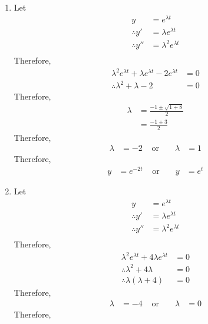 \documentclass[fleqn, a4paper, 11pt, oneside]{amsart}
\theoremstyle{definition}
\theoremstyle{theorem}
\begin{document}
\begin{solution}
	\begin{enumerate}[leftmargin = *]
		\item
			Let
			\begin{align*}
				y              & = e^{\lambda t}           \\
				\therefore y'  & = \lambda e^{\lambda t}   \\
				\therefore y'' & = \lambda^2 e^{\lambda t} \\
			\end{align*}
			Therefore,
			\begin{align*}
				\lambda^2 e^{\lambda t} + \lambda e^{\lambda t} - 2 e^{\lambda t} & = 0 \\
				\therefore \lambda^2 + \lambda - 2                                & = 0
			\end{align*}
			Therefore,
			\begin{align*}
				\lambda & = \frac{-1 \pm \sqrt{1 + 8}}{2} \\
                                        & = \frac{-1 \pm 3}{2}
			\end{align*}
			Therefore,
			\begin{align*}
				\lambda & = -2 & \text{ or } &  & \lambda & = 1
			\end{align*}
			Therefore,
			\begin{align*}
				y & = e^{-2 t} & \text{ or } &  & y & = e^{t}
			\end{align*}
		\item
			Let
			\begin{align*}
				y              & = e^{\lambda t}           \\
				\therefore y'  & = \lambda e^{\lambda t}   \\
				\therefore y'' & = \lambda^2 e^{\lambda t} \\
			\end{align*}
			Therefore,
			\begin{align*}
				\lambda^2 e^{\lambda t} + 4 \lambda e^{\lambda t} & = 0 \\
				\therefore \lambda^2 + 4 \lambda                  & = 0 \\
				\therefore \lambda (\lambda + 4)                  & = 0
			\end{align*}
			Therefore,
			\begin{align*}
				\lambda & = -4 & \text{ or } &  & \lambda & = 0
			\end{align*}
			Therefore,
			\begin{align*}

\end{align*}
\end{enumerate}
\end{solution}
\end{document}
